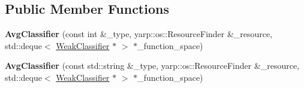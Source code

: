 \subsection*{Public Member Functions}
\begin{DoxyCompactItemize}
\item 
{\bfseries Avg\+Classifier} (const int \&\+\_\+type, yarp\+::os\+::\+Resource\+Finder \&\+\_\+resource, std\+::deque$<$ \hyperlink{classiCub_1_1boostMIL_1_1WeakClassifier}{Weak\+Classifier} $\ast$ $>$ $\ast$\+\_\+function\+\_\+space)\label{classiCub_1_1boostMIL_1_1AvgClassifier_afb39c1b839f4c26bd326d34ef54cd0d7}

\item 
{\bfseries Avg\+Classifier} (const std\+::string \&\+\_\+type, yarp\+::os\+::\+Resource\+Finder \&\+\_\+resource, std\+::deque$<$ \hyperlink{classiCub_1_1boostMIL_1_1WeakClassifier}{Weak\+Classifier} $\ast$ $>$ $\ast$\+\_\+function\+\_\+space)\label{classiCub_1_1boostMIL_1_1AvgClassifier_af8bf2ed549e424970836928af9f66b75}


\end{DoxyCompactItemize}
